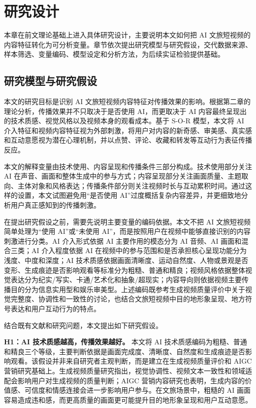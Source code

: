 \chapter{研究设计}

本章在前文理论基础上进入具体研究设计，主要说明本文如何把 AI 文旅短视频的内容特征转化为可分析变量。章节依次提出研究模型与研究假设，交代数据来源、样本筛选、变量编码、模型设定和分析方法，为后续实证检验提供基础。

\section{研究模型与研究假设}

本文的研究目标是识别 AI 文旅短视频内容特征对传播效果的影响。根据第二章的理论分析，传播效果并不只取决于是否使用 AI，而更取决于 AI 内容最终呈现出的技术质感、视觉风格以及视频本身的观看成本。基于 S-O-R 模型，本文将 AI 介入特征和视频内容特征视为外部刺激，将用户对内容的新奇感、审美感、真实感和互动意愿视为潜在心理机制，并以点赞、评论、收藏和转发等互动行为表征传播反应。

本文的解释变量由技术使用、内容呈现和传播条件三部分构成。技术使用部分关注 AI 在声音、画面和整体生成中的参与方式；内容呈现部分关注画面质量、主题取向、主体对象和风格表达；传播条件部分则关注视频时长与互动累积时间。通过这样的设置，本文试图避免用“是否使用 AI”过度概括复杂内容差异，并更细致地分析用户真正感知到的传播刺激。

在提出研究假设之前，需要先说明主要变量的编码依据。本文不把 AI 文旅短视频简单处理为“使用 AI”或“未使用 AI”，而是按照用户在视频中能够直接识别的内容刺激进行分类。AI 介入形式依据 AI 主要作用的模态分为 AI 音频、AI 画面和混合三类；AI 介入程度依据 AI 在视频中的参与范围和是否承担核心呈现功能分为浅度、中度和深度；AI 技术质感依据画面清晰度、运动自然度、人物或景观是否变形、生成痕迹是否影响观看等标准分为粗糙、普通和精良；视频风格依据整体视觉表达分为纪实/写实、卡通/艺术化和抽象/超现实；内容导向则依据视频主要传播目的分为信息实用型和娱乐审美型。上述编码既参考生成视频质量评价中关于视觉完整度、协调性和一致性的讨论，也结合文旅短视频中目的地形象呈现、地方符号表达和用户互动行为的特点。

结合既有文献和研究问题，本文提出如下研究假设。

\textbf{H1：AI 技术质感越高，传播效果越好。} 本文将 AI 技术质感编码为粗糙、普通和精良三个等级，主要判断依据是画面完成度、清晰度、自然度和生成痕迹是否影响观看。该假设并非来自研究者主观判断，而是建立在生成视频质量评价和 AIGC 营销研究基础上。生成视频质量研究指出，视觉协调性、视频文本一致性和领域适配会影响用户对生成视频的质量判断\cite{lit03}；AIGC 营销内容研究也表明，生成内容的价值感、可信度和情感连接会进一步影响用户参与\cite{lit18}。在文旅场景中，粗糙的 AI 画面容易造成违和感，而更高质量的画面更可能提升目的地形象呈现和用户互动意愿。

